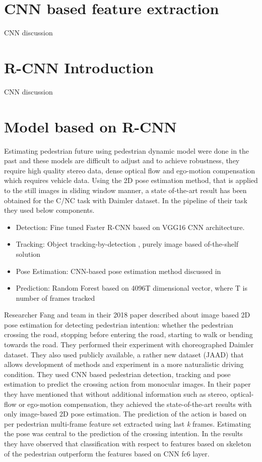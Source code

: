 \section{CNN based feature extraction}
\newpara  CNN discussion

\section{R-CNN Introduction}
\newpara  CNN discussion

\section{Model based on R-CNN }
\newpara Estimating pedestrian future using pedestrian dynamic model were done in the past and these models are difficult to adjust and to achieve robustness, they require high quality stereo data, dense optical flow and ego-motion compensation which requires vehicle data.  Using the 2D pose estimation method, that is applied to the still images in sliding window manner, a state of-the-art result has been obtained\cite{fang2018pedestrian} for the C/NC task with Daimler dataset. In the pipeline of their task they used below components.

\begin{itemize}
	\item Detection: Fine tuned Faster R-CNN \cite{ren2015faster} based on VGG16 CNN architecture. 
	\item Tracking: Object tracking-by-detection \cite{wojke2017simple}, purely image based of-the-shelf solution 
	\item Pose Estimation: CNN-based pose estimation method discussed in \cite{cao2017realtime}
	\item Prediction: Random Forest based on 4096T dimensional vector, where T is number of frames tracked
\end{itemize}

\newpara
Researcher Fang and team in their 2018 paper \cite{fang2018pedestrian} described about image based 2D pose estimation for detecting pedestrian intention: whether the pedestrian crossing the road, stopping before entering the road, starting to walk or bending towards the road. They performed their experiment with choreographed Daimler dataset. They also used publicly available, a rather new dataset (JAAD) \cite{kotseruba2016joint} that allows development of methods and experiment in a more naturalistic driving condition. They used CNN based pedestrian detection, tracking and pose estimation to predict the crossing action from monocular images. In their paper they have mentioned that without additional information such as stereo, optical-flow or ego-motion compensation, they achieved the state-of-the-art results with only image-based 2D pose estimation. The prediction of the action is based on per pedestrian multi-frame feature set extracted using last \textit{k} frames. Estimating the pose was central to the prediction of the crossing intention. In the results they have observed that classification with respect to features based on  skeleton of the pedestrian outperform the features based on CNN fc6 layer.

